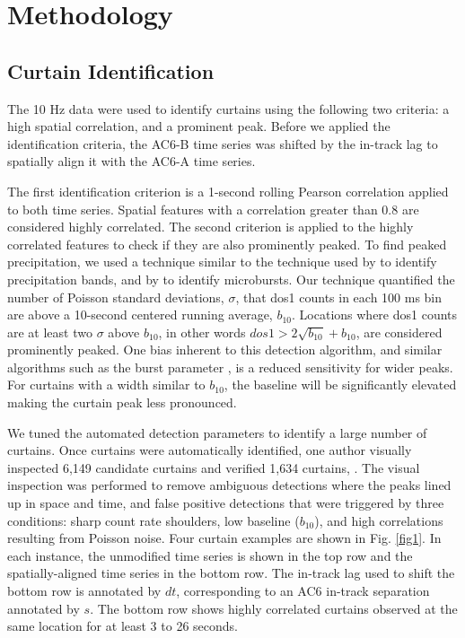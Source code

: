 \documentclass[draft]{agujournal2019}
\begin{document}
\section{Methodology} 
\subsection{Curtain Identification} \label{curtain_identification}
The 10 Hz data were used to identify curtains using the following two criteria: a high spatial correlation, and a prominent peak. Before we applied the identification criteria, the AC6-B time series was shifted by the in-track lag to spatially align it with the AC6-A time series. 

The first identification criterion is a 1-second rolling Pearson correlation applied to both time series. Spatial features with a correlation greater than 0.8 are considered highly correlated. The second criterion is applied to the highly correlated features to check if they are also prominently peaked. To find peaked precipitation, we used a technique similar to the technique used by  to identify precipitation bands, and by  to identify microbursts. Our technique quantified the number of Poisson standard deviations, $\sigma$, that dos1 counts in each 100 ms bin are above a 10-second centered running average, $b_{10}$. Locations where dos1 counts are at least two $\sigma$ above $b_{10}$, in other words $dos1 > 2\sqrt{b_{10}} + b_{10}$, are considered prominently peaked. One bias inherent to this detection algorithm, and similar algorithms such as the burst parameter \cite{O'Brien2003}, is a reduced sensitivity for wider peaks. For curtains with a width similar to $b_{10}$, the baseline will be significantly elevated making the curtain peak less pronounced. 

We tuned the automated detection parameters to identify a large number of curtains. Once curtains were automatically identified, one author visually inspected 6,149 candidate curtains and verified 1,634 curtains, . The visual inspection was performed to remove ambiguous detections where the peaks lined up in  space and time, and false positive detections that were triggered by three conditions: sharp count rate shoulders, low baseline ($b_{10}$), and high correlations resulting from Poisson noise. Four curtain examples are shown in Fig. \ref{fig1}. In each instance, the unmodified time series is shown in the top row and the spatially-aligned time series in the bottom row. The in-track lag used to shift the bottom row is annotated by $dt$, corresponding to an AC6 in-track separation annotated by $s$. The bottom row shows highly correlated curtains observed at the same location for at least 3 to 26 seconds.
\end{document}
